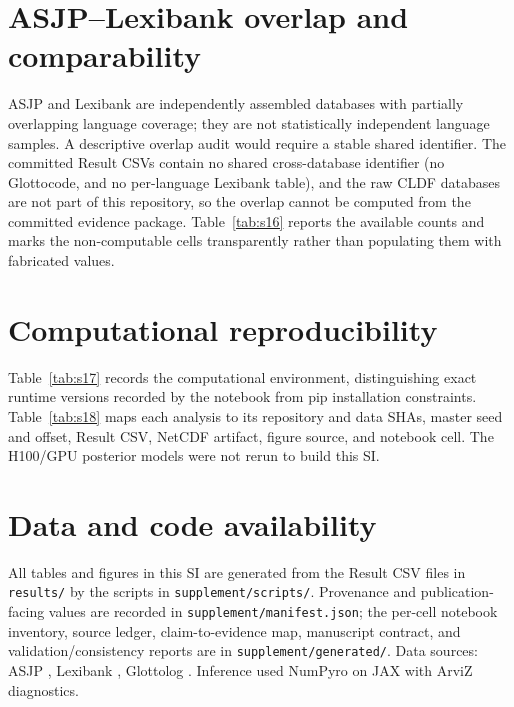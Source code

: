 \documentclass[preprint,12pt]{elsarticle}
\begin{document}
\section{ASJP--Lexibank overlap and comparability}
ASJP and Lexibank are independently assembled databases with partially overlapping
language coverage; they are not statistically independent language samples. A
descriptive overlap audit would require a stable shared identifier. The committed
Result CSVs contain no shared cross-database identifier (no Glottocode, and no
per-language Lexibank table), and the raw CLDF databases are not part of this
repository, so the overlap cannot be computed from the committed evidence package.
Table~\ref{tab:s16} reports the available counts and marks the non-computable cells
transparently rather than populating them with fabricated values.


\clearpage

\section{Computational reproducibility}
Table~\ref{tab:s17} records the computational environment, distinguishing exact
runtime versions recorded by the notebook from pip installation constraints.
Table~\ref{tab:s18} maps each analysis to its repository and data SHAs, master seed
and offset, Result CSV, NetCDF artifact, figure source, and notebook cell. The
H100/GPU posterior models were not rerun to build this SI.



\clearpage

\section*{Data and code availability}
All tables and figures in this SI are generated from the Result CSV files in
\texttt{results/} by the scripts in \texttt{supplement/scripts/}. Provenance and
publication-facing values are recorded in \texttt{supplement/manifest.json}; the
per-cell notebook inventory, source ledger, claim-to-evidence map, manuscript
contract, and validation/consistency reports are in \texttt{supplement/generated/}.
Data sources: ASJP \citep{asjp2022}, Lexibank \citep{list2022lexibank}, Glottolog
\citep{glottolog2023}. Inference used NumPyro \citep{phan2019numpyro} on JAX
\citep{jax2018} with ArviZ \citep{kumar2019arviz} diagnostics.



\end{document}
